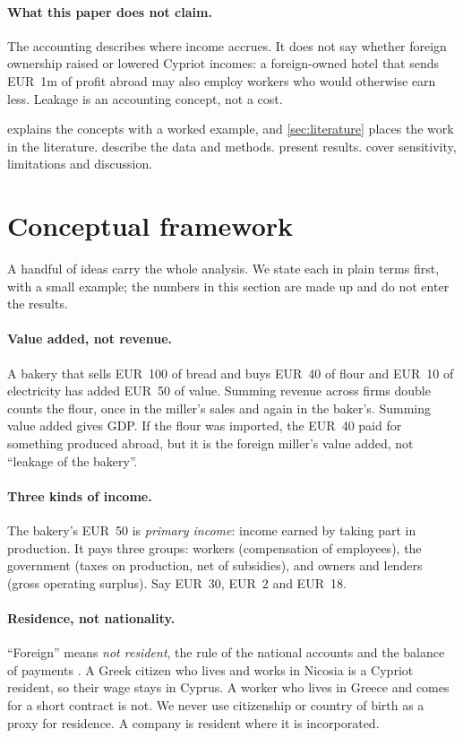 \documentclass[11pt]{article}
\newcommand{\EUR}{EUR~}
\begin{document}
\paragraph{What this paper does not claim.}
The accounting describes where income accrues.
It does not say whether foreign ownership raised or lowered Cypriot incomes: a foreign-owned hotel that sends \EUR1m of profit abroad may also employ workers who would otherwise earn less.
Leakage is an accounting concept, not a cost.

 explains the concepts with a worked example, and \cref{sec:literature} places the work in the literature.
 describe the data and methods.
 present results.
 cover sensitivity, limitations and discussion.

\section{Conceptual framework}
\label{sec:concepts}

A handful of ideas carry the whole analysis.
We state each in plain terms first, with a small example; the numbers in this section are made up and do not enter the results.

\paragraph{Value added, not revenue.}
A bakery that sells \EUR100 of bread and buys \EUR40 of flour and \EUR10 of electricity has added \EUR50 of value.
Summing revenue across firms double counts the flour, once in the miller's sales and again in the baker's.
Summing value added gives GDP.
If the flour was imported, the \EUR40 paid for something produced abroad, but it is the foreign miller's value added, not ``leakage of the bakery''.

\paragraph{Three kinds of income.}
The bakery's \EUR50 is \emph{primary income}: income earned by taking part in production.
It pays three groups: workers (compensation of employees), the government (taxes on production, net of subsidies), and owners and lenders (gross operating surplus).
Say \EUR30, \EUR2 and \EUR18.

\paragraph{Residence, not nationality.}
``Foreign'' means \emph{not resident}, the rule of the national accounts and the balance of payments \citep{UN2009SNA,IMF2009BPM6}.
A Greek citizen who lives and works in Nicosia is a Cypriot resident, so their wage stays in Cyprus.
A worker who lives in Greece and comes for a short contract is not.
We never use citizenship or country of birth as a proxy for residence.
A company is resident where it is incorporated.
\end{document}
